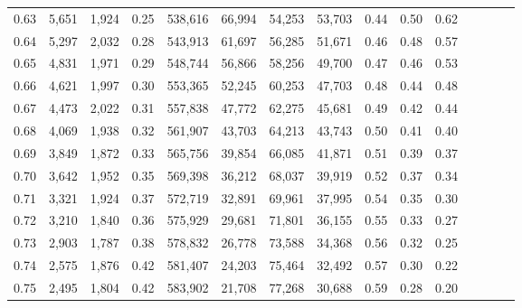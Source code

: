 \begin{tabular}{rrrcrrrrrrrrrrr}
0.63 &   5,651 &  1,924 &                                       0.25 &  538,616 &   66,994 &   54,253 &   53,703 &  0.44 &  0.50 &                         0.62 \\
0.64 &   5,297 &  2,032 &                                       0.28 &  543,913 &   61,697 &   56,285 &   51,671 &  0.46 &  0.48 &                         0.57 \\
0.65 &   4,831 &  1,971 &                                       0.29 &  548,744 &   56,866 &   58,256 &   49,700 &  0.47 &  0.46 &                         0.53 \\
0.66 &   4,621 &  1,997 &                                       0.30 &  553,365 &   52,245 &   60,253 &   47,703 &  0.48 &  0.44 &                         0.48 \\
0.67 &   4,473 &  2,022 &                                       0.31 &  557,838 &   47,772 &   62,275 &   45,681 &  0.49 &  0.42 &                         0.44 \\
0.68 &   4,069 &  1,938 &                                       0.32 &  561,907 &   43,703 &   64,213 &   43,743 &  0.50 &  0.41 &                         0.40 \\
0.69 &   3,849 &  1,872 &                                       0.33 &  565,756 &   39,854 &   66,085 &   41,871 &  0.51 &  0.39 &                         0.37 \\
0.70 &   3,642 &  1,952 &                                       0.35 &  569,398 &   36,212 &   68,037 &   39,919 &  0.52 &  0.37 &                         0.34 \\
0.71 &   3,321 &  1,924 &                                       0.37 &  572,719 &   32,891 &   69,961 &   37,995 &  0.54 &  0.35 &                         0.30 \\
0.72 &   3,210 &  1,840 &                                       0.36 &  575,929 &   29,681 &   71,801 &   36,155 &  0.55 &  0.33 &                         0.27 \\
0.73 &   2,903 &  1,787 &                                       0.38 &  578,832 &   26,778 &   73,588 &   34,368 &  0.56 &  0.32 &                         0.25 \\
0.74 &   2,575 &  1,876 &                                       0.42 &  581,407 &   24,203 &   75,464 &   32,492 &  0.57 &  0.30 &                         0.22 \\
0.75 &   2,495 &  1,804 &                                       0.42 &  583,902 &   21,708 &   77,268 &   30,688 &  0.59 &  0.28 &                         0.20 \\

\end{tabular}
